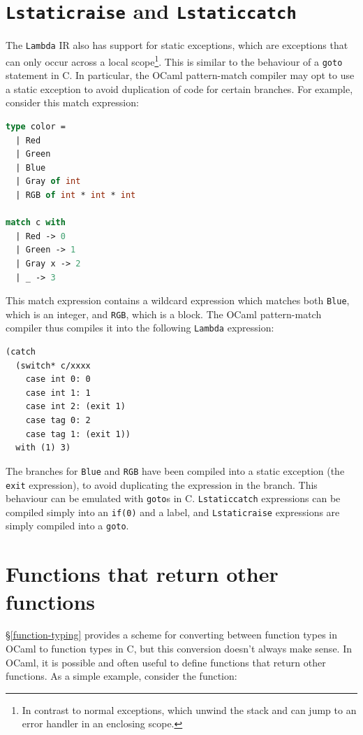\section{\texttt{Lstaticraise} and \texttt{Lstaticcatch}}

The \texttt{Lambda} IR also has support for static exceptions, which are
exceptions that can only occur across a local scope\footnote{In contrast to
normal exceptions, which unwind the stack and can jump to an error handler in an
enclosing scope.}. This is similar to the behaviour of a \texttt{goto} statement
in C. In particular, the OCaml pattern-match compiler may opt to use a static
exception to avoid duplication of code for certain branches. For example,
consider this match expression:

\begin{lstlisting}[language=Caml]
type color =
  | Red
  | Green
  | Blue
  | Gray of int
  | RGB of int * int * int

match c with
  | Red -> 0
  | Green -> 1
  | Gray x -> 2
  | _ -> 3
\end{lstlisting}

This match expression contains a wildcard expression which matches both 
\texttt{Blue}, which is an integer, and \texttt{RGB}, which is a block. The 
OCaml pattern-match compiler thus compiles it into the following 
\texttt{Lambda} expression:

\begin{lstlisting}
(catch
  (switch* c/xxxx
    case int 0: 0
    case int 1: 1
    case int 2: (exit 1)
    case tag 0: 2
    case tag 1: (exit 1))
  with (1) 3)
\end{lstlisting}

The branches for \texttt{Blue} and \texttt{RGB} have been compiled into a static
exception (the \texttt{exit} expression), to avoid duplicating the expression in
the branch. This behaviour can be emulated with \texttt{goto}s in C.
\texttt{Lstaticcatch} expressions can be compiled simply into an \texttt{if(0)}
and a label, and \texttt{Lstaticraise} expressions are simply compiled into a
\texttt{goto}.

\section{Functions that return other functions} \label{incomplete-funcs}

\S\ref{function-typing} provides a scheme for converting between function types
in OCaml to function types in C, but this conversion doesn't always make sense.
In OCaml, it is possible and often useful to define functions that return other
functions. As a simple example, consider the function:

